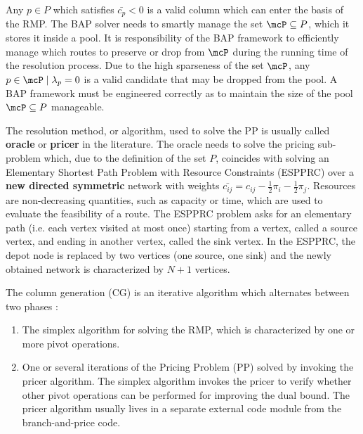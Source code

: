 Any $p \in P$ which satisfies $\bar{c_p} < 0$ is a valid column which can enter the basis of the RMP.
The BAP solver needs to smartly manage the set $\mcP \subseteq P$, which it stores it inside a pool.
It is responsibility of the BAP framework to efficiently manage which routes
to preserve or drop from $\mcP$ during the running time of the resolution process.
Due to the high sparseness of the set $\mcP$, any $p \in \mcP \mid \lambda_p = 0$
is a valid candidate that may be dropped from the pool.
A BAP framework must be engineered correctly as to maintain
the size of the pool $\mcP \subseteq P$ manageable.

\medskip

The resolution method, or algorithm,
used to solve the PP is usually called \textbf{oracle} or \textbf{pricer} in the literature.
The oracle needs to solve the pricing sub-problem which, due to the definition of the set $P$,
coincides with solving an Elementary Shortest Path Problem with Resource Constraints (ESPPRC)
over a \textbf{new directed symmetric} network with weights
$\bar{c_{ij}} = c_{ij} - \frac{1}{2} \pi_i - \frac{1}{2} \pi_j$.
Resources are non-decreasing quantities,
such as capacity or time,
which are used to evaluate
the feasibility of a route.
The ESPPRC problem asks for an elementary path (i.e. each vertex visited at most once) starting
from a vertex, called a source vertex, and ending in another vertex, called the sink vertex.
In the ESPPRC, the depot node is replaced by two vertices (one source, one sink)
and the newly obtained network is characterized by $N + 1$ vertices.

\medskip

The column generation (CG) is an iterative algorithm which alternates between two phases \parencite{desaulniers2018}:
\begin{enumerate}
	\setlength{\itemsep}{0pt}
	\setlength{\parskip}{0pt}

	\item The simplex algorithm for solving the RMP, which is characterized by one or more pivot operations.
	\item One or several iterations of the Pricing Problem (PP) solved by invoking the pricer algorithm.
	      The simplex algorithm invokes the pricer to verify whether other pivot operations
	      can be performed for improving the dual bound.
	      The pricer algorithm usually lives in a separate external code module from the branch-and-price code.
\end{enumerate}

